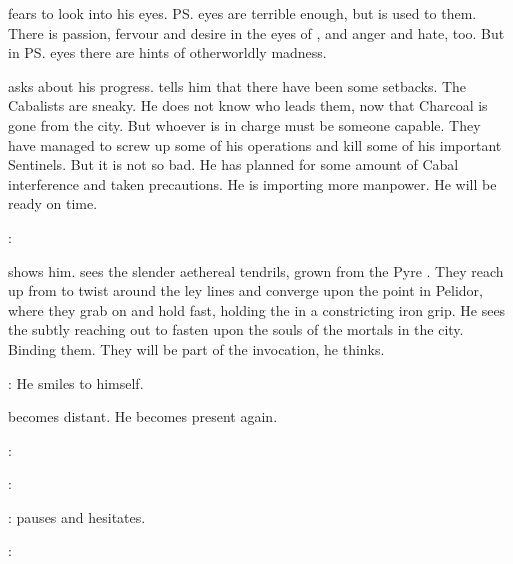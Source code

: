 \Psyrex fears to look into his eyes. 
\ps{\Secherdamon} eyes are terrible enough, but \Psyrex is used to them. 
There is passion, fervour and desire in the eyes of \Secherdamon, and anger and hate, too. 
But in \ps{\Vizsherioch} eyes there are hints of otherworldly madness. 

\Vizsherioch asks \Psyrex about his progress. 
\Psyrex tells him that there have been some setbacks. 
The Cabalists are sneaky.
He does not know who leads them, now that Charcoal is gone from the city. 
But whoever is in charge must be someone capable. 
They have managed to screw up some of his operations and kill some of his important Sentinels. 
But it is not so bad. 
He has planned for some amount of Cabal interference and taken precautions. 
He is importing more manpower. 
He will be ready on time. 

\Vizsherioch: 

\Psyrex shows him. 
\Vizsherioch sees the slender aethereal tendrils, grown from the Pyre \matrix.
They reach up from \Nithdornazsh to twist around the ley lines and converge upon the \nexus point in Pelidor, where they grab on and hold fast, holding the \nexus in a constricting iron grip. 
He sees the \matrix subtly reaching out to fasten upon the souls of the mortals in the city. 
Binding them.
They will be part of the invocation, he thinks. 

\Vizsherioch: 
He smiles to himself.

\Vizsherioch becomes distant.
He becomes present again.

\Psyrex:

\Vizsherioch:

\Psyrex:
\Psyrex pauses and hesitates. 

\Vizsherioch: 

